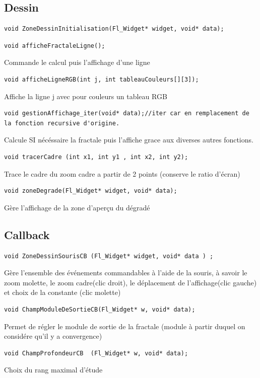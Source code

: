 \documentclass[a4paper,11pt]{article} \usepackage[T1]{fontenc} \usepackage[utf8]{inputenc} \usepackage[francais]{babel}
\begin{document}
\subsection{Dessin}
\begin{lstlisting}
void ZoneDessinInitialisation(Fl_Widget* widget, void* data);\end{lstlisting}
\begin{lstlisting}
void afficheFractaleLigne();\end{lstlisting}
Commande le calcul puis l'affichage d'une ligne
\begin{lstlisting}
void afficheLigneRGB(int j, int tableauCouleurs[][3]);\end{lstlisting}
Affiche la ligne j avec pour couleurs un tableau RGB
\begin{lstlisting}
void gestionAffichage_iter(void* data);//iter car en remplacement de la fonction recursive d'origine.\end{lstlisting}
Calcule SI nécéssaire la fractale puis l'affiche grace aux diverses autres fonctions.
\begin{lstlisting}
void tracerCadre (int x1, int y1 , int x2, int y2);\end{lstlisting}
Trace le cadre du zoom cadre a partir de 2 points (conserve le ratio d'écran)
\begin{lstlisting}
void zoneDegrade(Fl_Widget* widget, void* data);\end{lstlisting}
Gère l'affichage de la zone d’aperçu du dégradé

\subsection{Callback}
\begin{lstlisting}
void ZoneDessinSourisCB (Fl_Widget* widget, void* data ) ;\end{lstlisting}
Gère l'ensemble des événements commandables à l'aide de la souris, à savoir le zoom molette, le zoom cadre(clic droit), le déplacement de l'affichage(clic gauche) et choix de la constante (clic molette)
\begin{lstlisting}
void ChampModuleDeSortieCB(Fl_Widget* w, void* data);\end{lstlisting}
Permet de régler le module de sortie de la fractale (module à partir duquel on considére qu'il y a convergence)
\begin{lstlisting}
void ChampProfondeurCB  (Fl_Widget* w, void* data);\end{lstlisting}
Choix du rang maximal d'étude
\end{document}
